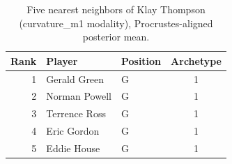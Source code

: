 \begin{table}[htbp]
  \centering\small
  \begin{tabular}{rllc}
    \toprule
    Rank & Player & Position & Archetype \\
    \midrule
    1 & Gerald Green & G & 1 \\
    2 & Norman Powell & G & 1 \\
    3 & Terrence Ross & G & 1 \\
    4 & Eric Gordon & G & 1 \\
    5 & Eddie House & G & 1 \\
    \bottomrule
  \end{tabular}
  \caption{Five nearest neighbors of Klay Thompson (curvature_m1 modality), Procrustes-aligned posterior mean.}
  \label{tab:Klay_Thompson_neighbors_curvature_m1}
\end{table}

